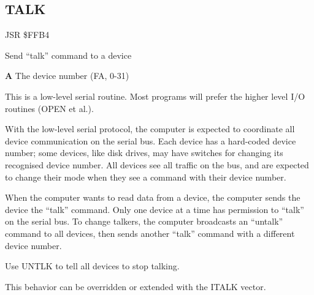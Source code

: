 \subsection{TALK}
\label{KERNAL Jump Table!TALK}
\begin{description}[leftmargin=2cm,style=nextline]
    \item [Address:] JSR \$FFB4
    \item [Description:] Send ``talk'' command to a device
    \item [Inputs:]
        \textbf{A} The device number (FA, 0-31)
    \item [Remarks:]
        This is a low-level serial routine. Most programs will prefer the higher level I/O routines (OPEN et al.).

        With the low-level serial protocol, the computer is expected to coordinate all device communication on the serial bus. Each device has a hard-coded device number; some devices, like disk drives, may have switches for changing its recognised device number. All devices see all traffic on the bus, and are expected to change their mode when they see a command with their device number.

        When the computer wants to read data from a device, the computer sends the device the ``talk'' command. Only one device at a time has permission to ``talk'' on the serial bus. To change talkers, the computer broadcasts an ``untalk'' command to all devices, then sends another ``talk'' command with a different device number.

        Use UNTLK to tell all devices to stop talking.

        This behavior can be overridden or extended with the ITALK vector.
    \item [Example:]
\end{description}



\newpage
